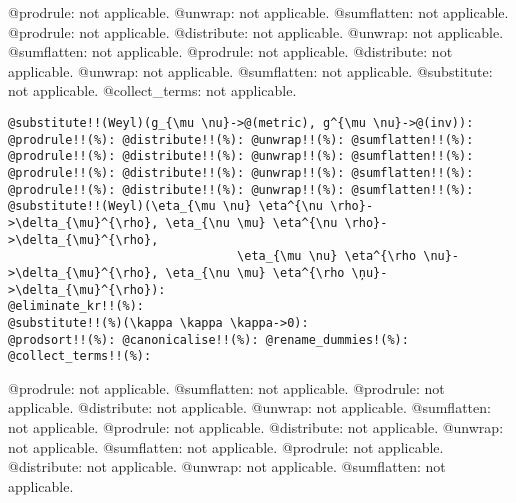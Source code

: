 \documentclass[11pt]{article}
\begin{document}
@prodrule: not applicable.
@unwrap: not applicable.
@sumflatten: not applicable.
@prodrule: not applicable.
@distribute: not applicable.
@unwrap: not applicable.
@sumflatten: not applicable.
@prodrule: not applicable.
@distribute: not applicable.
@unwrap: not applicable.
@sumflatten: not applicable.
@substitute: not applicable.
@collect\_terms: not applicable.
{\color[named]{Blue}\begin{verbatim}
@substitute!!(Weyl)(g_{\mu \nu}->@(metric), g^{\mu \nu}->@(inv)):
@prodrule!!(%): @distribute!!(%): @unwrap!!(%): @sumflatten!!(%):
@prodrule!!(%): @distribute!!(%): @unwrap!!(%): @sumflatten!!(%):
@prodrule!!(%): @distribute!!(%): @unwrap!!(%): @sumflatten!!(%):
@prodrule!!(%): @distribute!!(%): @unwrap!!(%): @sumflatten!!(%):
@substitute!!(Weyl)(\eta_{\mu \nu} \eta^{\nu \rho}->\delta_{\mu}^{\rho}, \eta_{\nu \mu} \eta^{\nu \rho}->\delta_{\mu}^{\rho},
                                \eta_{\mu \nu} \eta^{\rho \nu}->\delta_{\mu}^{\rho}, \eta_{\nu \mu} \eta^{\rho \ņu}->\delta_{\mu}^{\rho}):
@eliminate_kr!!(%):
@substitute!!(%)(\kappa \kappa \kappa->0):
@prodsort!!(%): @canonicalise!!(%): @rename_dummies!(%): @collect_terms!!(%):
\end{verbatim}}
@prodrule: not applicable.
@sumflatten: not applicable.
@prodrule: not applicable.
@distribute: not applicable.
@unwrap: not applicable.
@sumflatten: not applicable.
@prodrule: not applicable.
@distribute: not applicable.
@unwrap: not applicable.
@sumflatten: not applicable.
@prodrule: not applicable.
@distribute: not applicable.
@unwrap: not applicable.
@sumflatten: not applicable.
\end{document}
